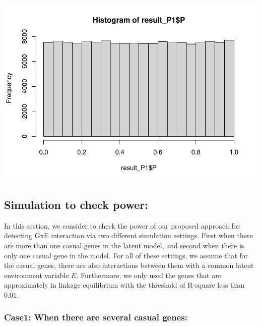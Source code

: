\documentclass[
]{article}
\newenvironment{Shaded}{\begin{snugshade}}{\end{snugshade}}
\newcommand{\CommentTok}[1]{\textcolor[rgb]{0.56,0.35,0.01}{\textit{#1}}}
\newcommand{\DataTypeTok}[1]{\textcolor[rgb]{0.13,0.29,0.53}{#1}}
\newcommand{\DecValTok}[1]{\textcolor[rgb]{0.00,0.00,0.81}{#1}}
\newcommand{\KeywordTok}[1]{\textcolor[rgb]{0.13,0.29,0.53}{\textbf{#1}}}
\newcommand{\NormalTok}[1]{#1}
\newcommand{\OperatorTok}[1]{\textcolor[rgb]{0.81,0.36,0.00}{\textbf{#1}}}
\begin{document}
\begin{Shaded}
\end{Shaded}

\includegraphics{stats-gene-research-progress-v7_files/figure-latex/unnamed-chunk-3-3.pdf}

\clearpage

\hypertarget{simulation-to-check-power}{%
\subsection{Simulation to check
power:}\label{simulation-to-check-power}}

In this section, we consider to check the power of our proposed approach
for detecting GxE interaction via two different simulation settings.
First when there are more than one casual genes in the latent model, and
second when there is only one casual gene in the model. For all of these
settings, we assume that for the casual genes, there are also
interactions between them with a common latent environment variable
\(E\). Furthermore, we only used the genes that are approximately in
linkage equilibrium with the threshold of R-square less than 0.01.

\hypertarget{case1-when-there-are-several-casual-genes}{%
\subsubsection{Case1: When there are several casual
genes:}\label{case1-when-there-are-several-casual-genes}}
\end{document}
